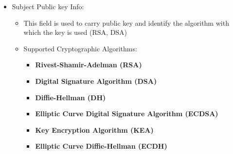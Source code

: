 \documentclass[12pt]{report}
\begin{document}
\begin{itemize}
            \item Subject Public key Info:
                \begin{itemize}
                    \item This field is used to carry public key and identify the algorithm with which the key is used (RSA, DSA)
                    \item Supported Cryptographic Algorithms:
                        \begin{itemize}
                            \item \textbf{Rivest-Shamir-Adelman (RSA)}
                            \item \textbf{Digital Signature Algorithm (DSA)}
                            \item \textbf{Diffie-Hellman (DH)}
                            \item \textbf{Elliptic Curve Digital Signature Algorithm (ECDSA)}
                            \item \textbf{Key Encryption Algorithm (KEA)}
                            \item \textbf{Elliptic Curve Diffie-Hellman (ECDH)}
                        \end{itemize}
                \end{itemize}
            \end{itemize}
\end{document}
